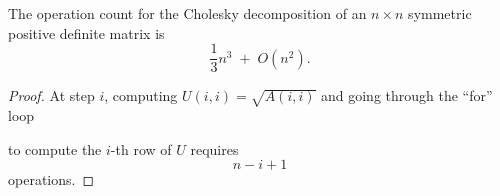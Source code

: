 
\begin{lemma}
The operation count for the Cholesky decomposition of an $n \times n$ symmetric
positive definite matrix is
\begin{equation}
\frac{1}{3}n^3 \;+\; O(n^2).
\end{equation}
\end{lemma}

\begin{proof}
At step $i$, computing $U(i,i) = \sqrt{A(i,i)}$ and going through the ``for'' loop
\begin{center}
\end{center}
to compute the $i$-th row of $U$ requires
\begin{equation}
n - i + 1
\end{equation}
operations.


\end{proof}

